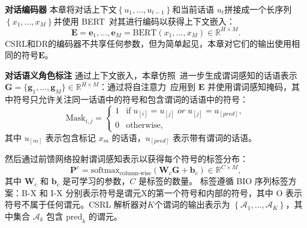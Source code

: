\noindent\textbf{对话编码器 } 本章将对话上下文$\left\{u_1,...,u_{t-1}\right\}$和当前话语 $u_t$拼接成一个长序列$\left\{x_1,...,x_M \right\}$并使用 BERT~\cite{devlin2018bert}对其进行编码以获得上下文嵌入：
\begin{equation}
   \mathbf{E} = \mathbf{e}_1, ..., \mathbf{e}_M=\textrm{BERT}(x_1,...,x_M) \in \mathbb{R}^{H \times M}. \nonumber
\end{equation}
CSRL和DR的编码器不共享任何参数，但为简单起见，本章对它们的输出使用相同的符号$\mathbf{E}$。

\noindent\textbf{对话语义角色标注 } 通过上下文嵌入，本章仿照~\citet{wu2021csagn}进一步生成谓词感知的话语表示$\mathbf{G} = \{\mathbf{g}_1, ..., \mathbf{g}_M\} \in \mathbb{R}^{H \times M}$：通过将自注意力~\cite{vaswani2017attention}应用到 $\mathbf{E}$ 并使用谓词感知掩码，其中符号只允许关注同一话语中的符号和包含谓词的话语中的符号：
\begin{equation}
\textrm{Mask}_{i,j} = 
    \begin{cases}
        1 & \text{if} \;u_{[i]} = u_{[j]} \; or \; u_{[j]} = u_{[pred]}, \\
        0 & \text{otherwise}, \nonumber
    \end{cases}
\end{equation}
其中 $u_{[m]}$ 表示包含标记 $x_m$ 的话语，$u_{[pred]}$ 表示带有谓词的话语。

然后通过前馈网络投射谓词感知表示以获得每个符号的标签分布：
\begin{equation}
    \mathbf{P}^c=\textrm{softmax}_{\textrm{column-wise}}(\mathbf{W}_c\mathbf{G} + \mathbf{b}_c) \in \mathbb{R}^{C \times M}, \nonumber
\end{equation}
其中 $\mathbf{W}_c$ 和 $\mathbf{b}_c$ 是可学习的参数，$C$ 是标签的数量。 标签遵循 BIO 序列标签方案：B-X 和 I-X 分别表示符号是谓元X的第一个符号和内部的符号，其中 O 表示符号不属于任何谓元。CSRL 解析器对$K$个谓词的输出表示为 $\left\{\mathcal{A}_1, ..., \mathcal{A}_K\right\}$，其中集合 $\mathcal{A} _k$ 包含 $\text{pred}_k$ 的谓元。

